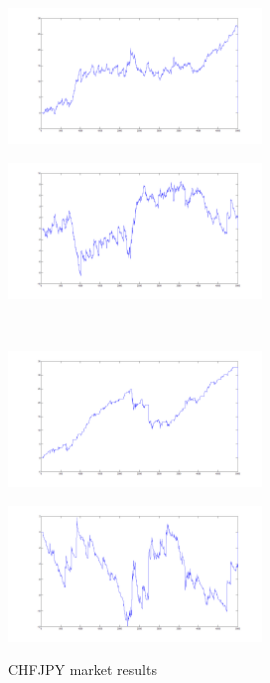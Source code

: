 \documentclass{tewiart}
\begin{document}
\begin{figure}[h]
\centering
\begin{minipage}{\linewidth}
\centering
\includegraphics[width=0.6\textwidth]{images/chfjpyA.png}
\label{jedno}
\end{minipage}
\begin{minipage}{\linewidth}
\centering
\includegraphics[width=0.6\textwidth]{images/chfjpyB.png}
\label{dwu}
\end{minipage}
\\
\begin{minipage}{\linewidth}
\centering
\includegraphics[width=0.6\textwidth]{images/chfjpyC.png}
\label{cztero}
\end{minipage}
\begin{minipage}{\linewidth}
\centering
\includegraphics[width=0.6\textwidth]{images/chfjpyD.png}
\label{mansard}
\end{minipage}
\caption{CHFJPY market results}
\end{figure}
\end{document}
